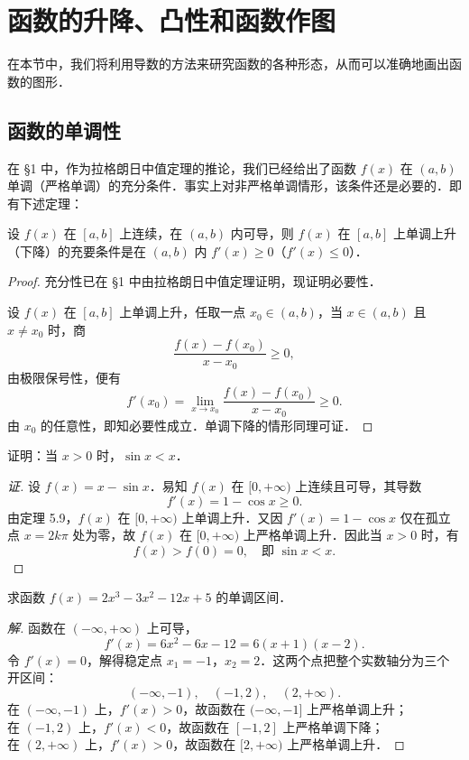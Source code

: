 \section{函数的升降、凸性和函数作图}\label{sec:5.3}

在本节中，我们将利用导数的方法来研究函数的各种形态，从而可以准确地画出函数的图形．

\subsection{函数的单调性}

在 §1 中，作为拉格朗日中值定理的推论，我们已经给出了函数 $f(x)$ 在 $(a,b)$ 单调（严格单调）的充分条件．事实上对非严格单调情形，该条件还是必要的．即有下述定理：

\begin{theorem}\label{thm:5-9}
设 $f(x)$ 在 $[a,b]$ 上连续，在 $(a,b)$ 内可导，则 $f(x)$ 在 $[a,b]$ 上单调上升（下降）的充要条件是在 $(a,b)$ 内 $f'(x) \geqslant 0$（$f'(x) \leqslant 0$）．
\end{theorem}

\begin{proof}
充分性已在 §1 中由拉格朗日中值定理证明，现证明必要性．

设 $f(x)$ 在 $[a,b]$ 上单调上升，任取一点 $x_0 \in (a,b)$，当 $x \in (a,b)$ 且 $x \neq x_0$ 时，商
\[
\frac{f(x) - f(x_0)}{x - x_0} \geqslant 0,
\]
由极限保号性，便有
\[
f'(x_0) = \lim_{x\to x_0} \frac{f(x) - f(x_0)}{x - x_0} \geqslant 0.
\]
由 $x_0$ 的任意性，即知必要性成立．单调下降的情形同理可证．
\end{proof}

\begin{example}
证明：当 $x > 0$ 时，$\sin x < x$．
\end{example}

\begin{proof}[证]
设 $f(x) = x - \sin x$．易知 $f(x)$ 在 $[0, +\infty)$ 上连续且可导，其导数
\[
f'(x) = 1 - \cos x \geqslant 0.
\]
由定理 5.9，$f(x)$ 在 $[0, +\infty)$ 上单调上升．又因 $f'(x) = 1 - \cos x$ 仅在孤立点 $x = 2k\pi$ 处为零，故 $f(x)$ 在 $[0, +\infty)$ 上严格单调上升．因此当 $x > 0$ 时，有
\[
f(x) > f(0) = 0,\quad \text{即 }\sin x < x.
\]
\end{proof}

\begin{example}
求函数 $f(x) = 2x^3 - 3x^2 - 12x + 5$ 的单调区间．
\end{example}

\begin{proof}[解]
函数在 $(-\infty, +\infty)$ 上可导，
\[
f'(x) = 6x^2 - 6x - 12 = 6(x+1)(x-2).
\]
令 $f'(x) = 0$，解得稳定点 $x_1 = -1$，$x_2 = 2$．这两个点把整个实数轴分为三个开区间：
\[
(-\infty, -1),\quad (-1, 2),\quad (2, +\infty).
\]
在 $(-\infty, -1)$ 上，$f'(x) > 0$，故函数在 $(-\infty, -1]$ 上严格单调上升；\\
在 $(-1, 2)$ 上，$f'(x) < 0$，故函数在 $[-1, 2]$ 上严格单调下降；\\
在 $(2, +\infty)$ 上，$f'(x) > 0$，故函数在 $[2, +\infty)$ 上严格单调上升．
\end{proof}

